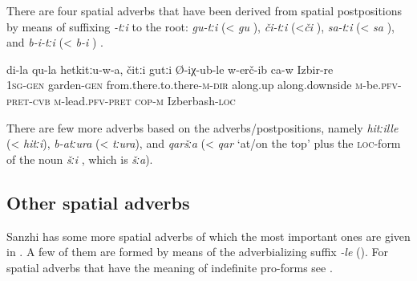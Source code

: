 There are four spatial adverbs that have been derived from spatial postpositions by means of suffixing \textit{-tːi} to the root: \textit{gu-tːi}  (< \textit{gu} ), \textit{či-tːi}  (<\textit{či} ), \textit{sa-tːi}  (< \textit{sa} ), and \textit{b-i-tːi}  (< \textit{b-i} ) .

\begin{exe}
	\ex	\label{ex:Through my garden up down they brought him to Izberbash}
	\gll	di-la	qu-la	hetkitːu-w-a,	čitːi	gutːi	Ø-iχ-ub-le	w-erč-ib ca-w	Izbir-re\\
		1\textsc{sg-gen}	garden-\textsc{gen}	from.there.to.there-\textsc{m-dir}	along.up along.downside	\textsc{m}-be.\textsc{pfv-pret-cvb}	\textsc{m}-lead.\textsc{pfv}-\textsc{pret} \textsc{cop-m}	Izberbash-\textsc{loc}\\
	\glt	{}
\end{exe}

There are few more adverbs based on the adverbs/postpositions, namely \textit{hitːille}  (< \textit{hitːi}), \textit{b-atːura}  (< \textit{tːura}), and \textit{qaršːa}  (< \textit{qar} `at/on the top' plus the \textsc{loc}-form of the noun \textit{šːi} , which is \textit{šːa}).



\subsection{Other spatial adverbs}
\label{ssec:OtherSpatialAdverbs}

Sanzhi has some more spatial adverbs of which the most important ones are given in . A few of them are formed by means of the adverbializing suffix \textit{-le} (). For spatial adverbs that have the meaning of indefinite pro-forms see .

